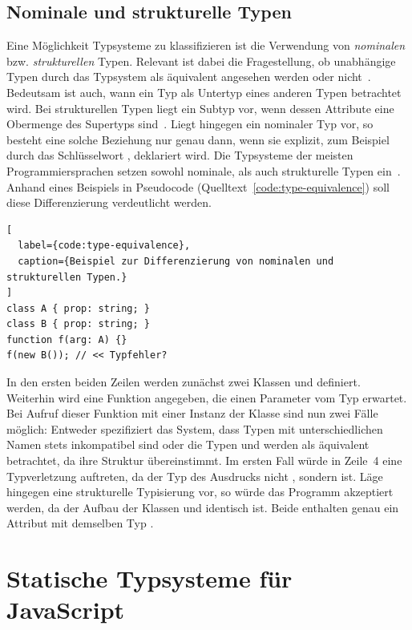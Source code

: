 \subsection{Nominale und strukturelle Typen}
Eine Möglichkeit Typsysteme zu klassifizieren ist die Verwendung von \textit{nominalen} bzw. \textit{strukturellen} Typen. Relevant ist dabei die Fragestellung, ob unabhängige Typen durch das Typsystem als äquivalent angesehen werden oder nicht~\autocite[9]{CARDELLI:TYPE_SYSTEMS}. Bedeutsam ist auch, wann ein Typ als Untertyp eines anderen Typen betrachtet wird. Bei strukturellen Typen liegt ein Subtyp vor, wenn dessen Attribute eine Obermenge des Supertyps sind~\autocite{MALAYERI:2008}. Liegt hingegen ein nominaler Typ vor, so besteht eine solche Beziehung nur genau dann, wenn sie explizit, zum Beispiel durch das Schlüsselwort , deklariert wird. Die Typsysteme der meisten Programmiersprachen setzen sowohl nominale, als auch strukturelle Typen ein~\autocite[9]{CARDELLI:TYPE_SYSTEMS}. Anhand eines Beispiels in Pseudocode (Quelltext~\ref{code:type-equivalence}) soll diese Differenzierung verdeutlicht werden.

\begin{lstlisting}[
  label={code:type-equivalence},
  caption={Beispiel zur Differenzierung von nominalen und strukturellen Typen.}
]
class A { prop: string; }
class B { prop: string; }
function f(arg: A) {}
f(new B()); // << Typfehler?
\end{lstlisting}

In den ersten beiden Zeilen werden zunächst zwei Klassen  und  definiert. Weiterhin wird eine Funktion  angegeben, die einen Parameter vom Typ  erwartet. Bei Aufruf dieser Funktion mit einer Instanz der Klasse  sind nun zwei Fälle möglich: Entweder spezifiziert das System, dass Typen mit unterschiedlichen Namen stets inkompatibel sind oder die Typen  und  werden als äquivalent betrachtet, da ihre Struktur übereinstimmt. Im ersten Fall würde in Zeile~4 eine Typverletzung auftreten, da der Typ des Ausdrucks  nicht , sondern  ist. Läge hingegen eine strukturelle Typisierung vor, so würde das Programm akzeptiert werden, da der Aufbau der Klassen  und  identisch ist. Beide enthalten genau ein Attribut  mit demselben Typ .

\section{Statische Typsysteme für JavaScript}
\label{sec:static-typesystems-for-js}

